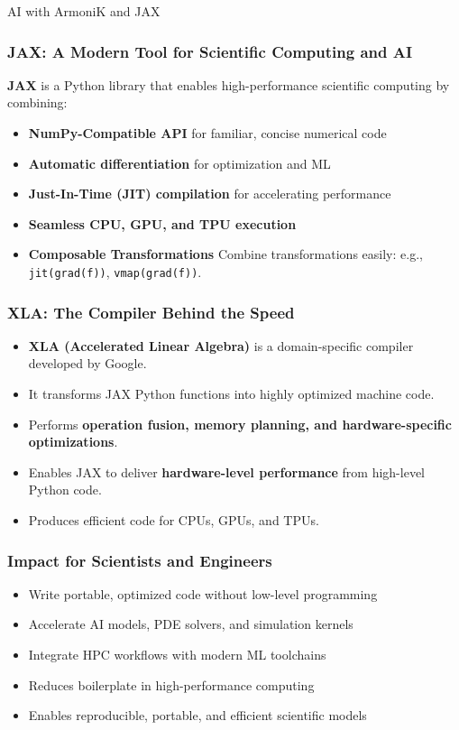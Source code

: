 \documentclass[10pt,aspectratio=1609]{beamer}
\begin{document}
\begin{section}{AI with ArmoniK and JAX}
 \begin{frame}
   \frametitle{JAX: A Modern Tool for Scientific Computing and AI}
   \textbf{JAX} is a Python library that enables high-performance scientific computing by combining:
   \begin{itemize}
     \item \textbf{NumPy-Compatible API} for familiar, concise numerical code
     \item \textbf{Automatic differentiation} for optimization and ML
     \item \textbf{Just-In-Time (JIT) compilation} for accelerating performance
     \item \textbf{Seamless CPU, GPU, and TPU execution}
     \item \textbf{Composable Transformations} Combine transformations easily: e.g., \texttt{jit(grad(f))}, \texttt{vmap(grad(f))}.
   \end{itemize}
 \end{frame}

 \begin{frame}
   \frametitle{XLA: The Compiler Behind the Speed}
   \begin{itemize}
     \item \textbf{XLA (Accelerated Linear Algebra)} is a domain-specific compiler developed by Google.
     \item It transforms JAX Python functions into highly optimized machine code.
     \item Performs \textbf{operation fusion, memory planning, and hardware-specific optimizations}.
     \item Enables JAX to deliver \textbf{hardware-level performance} from high-level Python code.
     \item Produces efficient code for CPUs, GPUs, and TPUs.
   \end{itemize}
 \end{frame}

 \begin{frame}
   \frametitle{Impact for Scientists and Engineers}
   \begin{itemize}
     \item Write portable, optimized code without low-level programming
     \item Accelerate AI models, PDE solvers, and simulation kernels
     \item Integrate HPC workflows with modern ML toolchains
     \item Reduces boilerplate in high-performance computing
     \item Enables reproducible, portable, and efficient scientific models
   \end{itemize}
 \end{frame}


\end{section}
\end{document}
